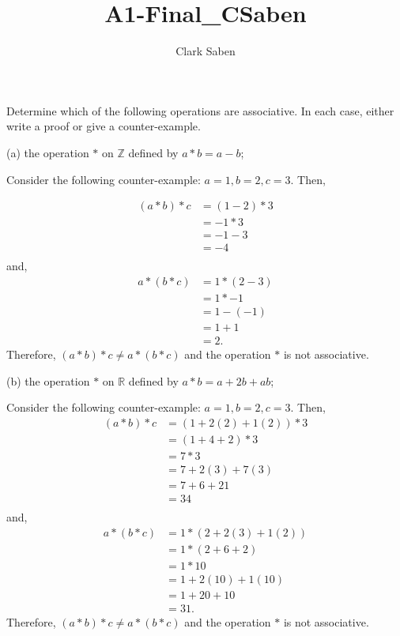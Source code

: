 \documentclass[12pt]{article}
\newenvironment{problem}[2][Problem]{\begin{trivlist}
\item[\hskip \labelsep {\bfseries #1}\hskip \labelsep {\bfseries #2.}]}{\end{trivlist}}
\begin{document}
 
 
\title{A1-Final\_CSaben}
\author{Clark Saben}

 
\maketitle

\begin{problem}{1}

Determine which of the following operations are associative. In each case, either write a proof or give a counter-example.

(a) the operation $*$ on $\mathbb{Z}$ defined by $a * b=a-b$;

Consider the following counter-example: $a=1, b=2, c=3$. Then,

$$
\begin{aligned}
	(a * b) * c &= (1-2) * 3 \\
		    &= -1 * 3 \\
		    &= -1-3 \\
		    &= -4 \\
\end{aligned}
$$
and,
$$
\begin{aligned}
	a * (b * c) &= 1 * (2-3) \\
		    &= 1 * -1 \\
		    &= 1-(-1) \\
		    &= 1+1 \\
		    &= 2.
\end{aligned}
$$
Therefore, $(a * b) * c \neq a * (b * c)$ and the operation $*$ is not associative.
\break

(b) the operation $*$ on $\mathbb{R}$ defined by $a * b=a+2 b+a b$;

Consider the following counter-example: $a=1, b=2, c=3$. Then,
$$
\begin{aligned}
	(a * b) * c &= (1+2(2)+1(2)) * 3\\
		    &= (1+4+2) * 3 \\
		    &= 7 * 3 \\
		    &= 7+2(3)+7(3) \\
		    &= 7+6+21  \\
		    &= 34 \\
\end{aligned}
$$
and,
$$
\begin{aligned}
	a * (b * c) &= 1 * (2+2(3)+1(2)) \\
		    &= 1 * (2+6+2) \\
		    &= 1 * 10 \\
		    &= 1+2(10)+1(10) \\
		    &= 1+20+10 \\
		    &= 31.
\end{aligned}
$$
Therefore, $(a * b) * c \neq a * (b * c)$ and the operation $*$ is not associative.
\break


\end{problem}
\end{document}
